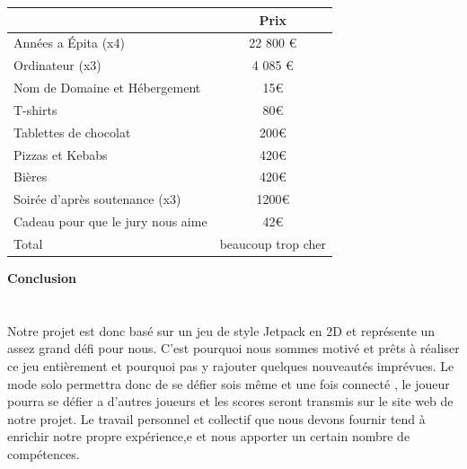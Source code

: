 \documentclass [11pt]{report}
\begin{document}
				\begin{tabular}{|l|c|}
				\hline
		 		 & Prix \\
				\hline
				Années a \'Epita (x4) & 22 800 € \\
				\hline
				Ordinateur (x3) & 4 085 €  \\
				\hline
				Nom de Domaine et Hébergement &  15€ \\
				\hline
				T-shirts & 80€ \\
				\hline
				Tablettes de chocolat & 200€ \\
				\hline
				Pizzas et Kebabs & 420€  \\
				\hline
				Bières  & 420€   \\
	          			 \hline
				Soirée d'après soutenance (x3) & 1200€\\
				\hline 
				Cadeau pour que le jury nous aime & 42€ \\
				\hline
				Total & beaucoup trop cher \\
				\hline
				
			\end{tabular}
\newpage
\textbf{{\Huge Conclusion}}\\
\\
\\\indent	Notre projet est donc basé sur un jeu de style Jetpack en 2D et représente un assez grand défi pour nous. C’est pourquoi nous sommes motivé et prêts à réaliser ce jeu entièrement et pourquoi pas y rajouter quelques nouveautés imprévues. Le mode solo permettra donc de se défier sois même et une fois connecté , le joueur pourra se défier a d’autres joueurs et les scores seront transmis sur le site web de notre projet. Le travail personnel et collectif que nous devons fournir tend à enrichir notre propre expérience,e et nous apporter un certain nombre de comp\'etences.
\end{document}
